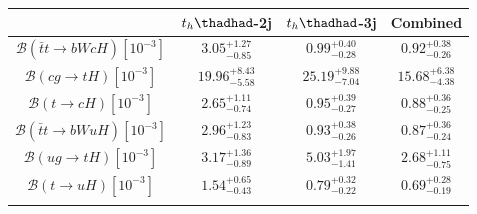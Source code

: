 \begin{tabular}{cccc} \toprule\toprule
 & $t_h\thadhad$-2j & $t_h\thadhad$-3j & Combined\\\midrule



$\mathcal{B}(\bar{t}t\to bWcH)[10^{-3}]$       & $3.05^{+1.27}_{-0.85}$ & $0.99^{+0.40}_{-0.28}$ & $0.92^{+0.38}_{-0.26}$\\
$\mathcal{B}(cg\to tH)[10^{-3}]$               & $19.96^{+8.43}_{-5.58}$ & $25.19^{+9.88}_{-7.04}$ & $15.68^{+6.38}_{-4.38}$\\
$\mathcal{B}(t\to cH)[10^{-3}]$               & $2.65^{+1.11}_{-0.74}$ & $0.95^{+0.39}_{-0.27}$ & $0.88^{+0.36}_{-0.25}$\\
$\mathcal{B}(\bar{t}t\to bWuH)[10^{-3}]$       & $2.96^{+1.23}_{-0.83}$ & $0.93^{+0.38}_{-0.26}$ & $0.87^{+0.36}_{-0.24}$\\
$\mathcal{B}(ug\to tH)[10^{-3}]$               & $3.17^{+1.36}_{-0.89}$ & $5.03^{+1.97}_{-1.41}$ & $2.68^{+1.11}_{-0.75}$\\
$\mathcal{B}(t\to uH)[10^{-3}]$      & $1.54^{+0.65}_{-0.43}$ & $0.79^{+0.32}_{-0.22}$ & $0.69^{+0.28}_{-0.19}$\\
\bottomrule\bottomrule\\
\end{tabular}


